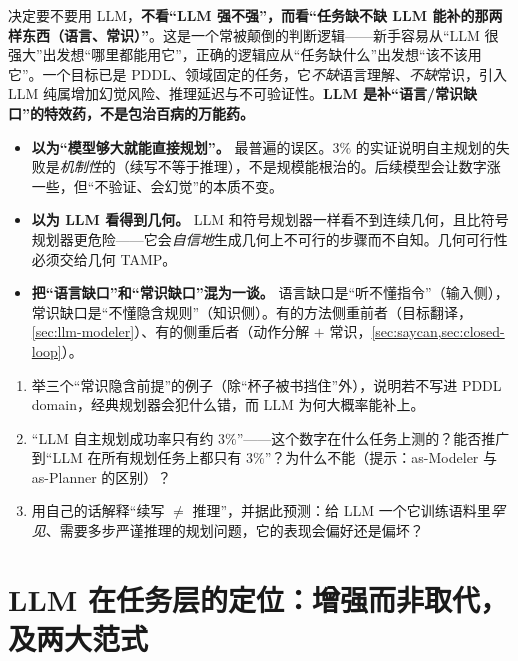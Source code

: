 \begin{insight}
决定要不要用 LLM，\textbf{不看“LLM 强不强”，而看“任务缺不缺 LLM 能补的那两样东西（语言、常识）”}。这是一个常被颠倒的判断逻辑——新手容易从“LLM 很强大”出发想“哪里都能用它”，正确的逻辑应从“任务缺什么”出发想“该不该用它”。一个目标已是 PDDL、领域固定的任务，它\emph{不缺}语言理解、\emph{不缺}常识，引入 LLM 纯属增加幻觉风险、推理延迟与不可验证性。\textbf{LLM 是补“语言/常识缺口”的特效药，不是包治百病的万能药。}
\end{insight}

\begin{pitfall}[本节常见陷阱]
\begin{itemize}
  \item \textbf{以为“模型够大就能直接规划”。} 最普遍的误区。$3\%$ 的实证\cite{valmeekam2023planbench}说明自主规划的失败是\emph{机制性}的（续写不等于推理），不是规模能根治的。后续模型会让数字涨一些，但“不验证、会幻觉”的本质不变。
  \item \textbf{以为 LLM 看得到几何。} LLM 和符号规划器一样看不到连续几何，且比符号规划器更危险——它会\emph{自信地}生成几何上不可行的步骤而不自知。几何可行性必须交给几何 TAMP。
  \item \textbf{把“语言缺口”和“常识缺口”混为一谈。} 语言缺口是“听不懂指令”（输入侧），常识缺口是“不懂隐含规则”（知识侧）。有的方法侧重前者（目标翻译，\cref{sec:llm-modeler}）、有的侧重后者（动作分解 $+$ 常识，\cref{sec:saycan,sec:closed-loop}）。
\end{itemize}
\end{pitfall}

\begin{exercise}
\begin{enumerate}
  \item 举三个“常识隐含前提”的例子（除“杯子被书挡住”外），说明若不写进 PDDL domain，经典规划器会犯什么错，而 LLM 为何大概率能补上。
  \item “LLM 自主规划成功率只有约 $3\%$”——这个数字在什么任务上测的？能否推广到“LLM 在所有规划任务上都只有 $3\%$”？为什么不能（提示：as-Modeler 与 as-Planner 的区别）？
  \item 用自己的话解释“续写 $\neq$ 推理”，并据此预测：给 LLM 一个它训练语料里\emph{罕见}、需要多步严谨推理的规划问题，它的表现会偏好还是偏坏？
\end{enumerate}
\end{exercise}

\section{LLM 在任务层的定位：增强而非取代，及两大范式}
\label{sec:llm-position}

